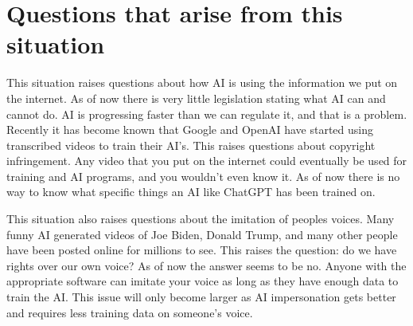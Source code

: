 \section{Questions that arise from this situation}
\label{sec:ai}





   This situation raises questions about how AI is using the information we put on the internet. As of now there is very little legislation stating what AI can and cannot do. AI is progressing faster than we can regulate it, and that is a problem. Recently it has become known that Google and OpenAI have started using transcribed videos to train their AI’s. This raises questions about copyright infringement. Any video that you put on the internet could eventually be used for training and AI programs, and you wouldn’t even know it. As of now there is no way to know what specific things an AI like ChatGPT has been trained on.
   
   This situation also raises questions about the imitation of peoples voices. Many funny AI generated videos of Joe Biden, Donald Trump, and many other people have been posted online for millions to see. This raises the question: do we have rights over our own voice? As of now the answer seems to be no. Anyone with the appropriate software can imitate your voice as long as they have enough data to train the AI. 
   This issue will only become larger as AI impersonation gets better and requires less training data on someone's voice. 
